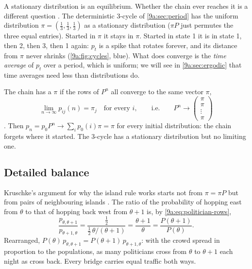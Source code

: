 A stationary distribution is an equilibrium. Whether the chain ever reaches it is a different
question . The deterministic 3-cycle of \cref{9a:sec:period} has
the uniform distribution $\pi=(\tfrac13,\tfrac13,\tfrac13)$ as a stationary distribution
($\pi P$ just permutes the three equal entries). Started in $\pi$ it stays in $\pi$. Started in
state 1 it is in state 1, then 2, then 3, then 1 again: $p_t$ is a spike that rotates forever,
and its distance from $\pi$ never shrinks (\cref{9a:fig:cycles}, blue). What does converge is the
\emph{time average} of $p_t$ over a period, which is uniform; we will see in
\cref{9a:sec:ergodic} that time averages need less than distributions do.

The chain has a  $\pi$ if the rows of $P^n$ all converge to the
same vector $\pi$,
\begin{equation}
  \lim_{n\to\infty}p_{ij}(n)=\pi_j\quad\text{for every }i,
  \qquad\text{i.e.}\qquad
  P^n\to\begin{pmatrix}\pi\\ \pi\\ \vdots\\ \pi\end{pmatrix}
  \label{9a:eq:limiting}
\end{equation}
. Then $p_n=p_0P^n\to\sum_ip_0(i)\pi=\pi$ for every initial
distribution: the chain forgets where it started. The 3-cycle has a stationary distribution but
no limiting one.

\subsection{Detailed balance}
\label{9a:sec:detailed-balance}

Kruschke's argument for why the island rule works starts not from $\pi=\pi P$ but from pairs
of neighbouring islands . The ratio of the probability of
hopping east from $\theta$ to that of hopping back west from $\theta+1$ is, by
\eqref{9a:eq:politician-rows},
\begin{equation*}
  \frac{p_{\theta,\theta+1}}{p_{\theta+1,\theta}}
  =\frac{\tfrac12}{\tfrac12\,\theta/(\theta+1)}
  =\frac{\theta+1}{\theta}
  =\frac{P(\theta+1)}{P(\theta)} .
\end{equation*}
Rearranged, $P(\theta)\,p_{\theta,\theta+1}=P(\theta+1)\,p_{\theta+1,\theta}$: with the crowd
spread in proportion to the populations, as many politicians cross from $\theta$ to $\theta+1$
each night as cross back. Every bridge carries equal traffic both ways.

